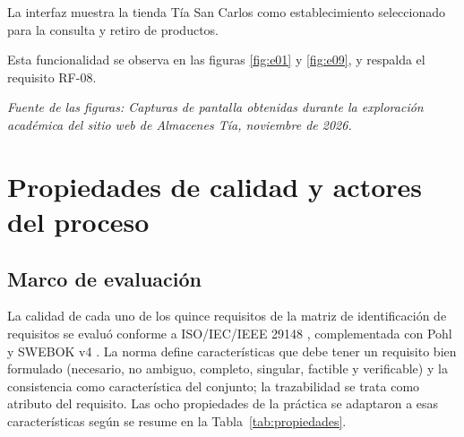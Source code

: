 \documentclass[12pt,a4paper]{article}
\begin{document}
La interfaz muestra la tienda Tía San Carlos
como establecimiento seleccionado para
la consulta y retiro de productos.

Esta funcionalidad se observa en las
figuras \ref{fig:e01} y \ref{fig:e09},
y respalda el requisito RF-08.

\noindent\textit{Fuente de las figuras:
Capturas de pantalla obtenidas durante
la exploración académica del sitio web
de Almacenes Tía, noviembre de 2026.}


\section{Propiedades de calidad y actores del proceso}

\subsection{Marco de evaluación}

La calidad de cada uno de los quince requisitos de la
matriz de identificación de requisitos se evaluó conforme a
ISO/IEC/IEEE 29148 \cite{iso29148}, complementada con
Pohl \cite{pohl2010} y SWEBOK v4 \cite{swebok2024}. La norma
define características que debe tener un requisito bien
formulado (necesario, no ambiguo, completo, singular,
factible y verificable) y la consistencia como característica
del conjunto; la trazabilidad se trata como atributo del
requisito. Las ocho propiedades de la práctica se adaptaron
a esas características según se resume en la
Tabla~\ref{tab:propiedades}.
\end{document}
